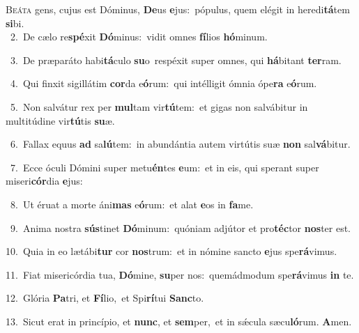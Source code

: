\lettrine{\initial\textcolor{\initialcolor}{B}}{eáta} gens, cujus est Dóminus, \textbf{De}\-us \textbf{e}\-jus:~\star pópulus, quem elégit in heredi\-\textbf{tá}\-tem \textbf{si}\-bi.\\
{\numbfont\textcolor{\numbcolor}{~2.}}~De cælo re\-\textbf{spé}\-xit \textbf{Dó}\-minus:~\star vidit omnes \textbf{fí}\-lios \textbf{hó}\-minum.\par
{\numbfont\textcolor{\numbcolor}{~3.}}~De præparáto habi\-\textbf{tá}\-culo \textbf{su}\-o~\star respéxit super omnes, qui \textbf{há}\-bitant \textbf{ter}\-ram.\par
{\numbfont\textcolor{\numbcolor}{~4.}}~Qui finxit sigillátim \textbf{cor}\-da e\-\textbf{ó}\-rum:~\star qui intélligit ómnia ópe\textbf{ra} e\-\textbf{ó}\-rum.\par
{\numbfont\textcolor{\numbcolor}{~5.}}~Non salvátur rex per \textbf{mul}\-tam vir\-\textbf{tú}\-tem:~\star et gigas non salvábitur in multitúdine vir\-\textbf{tú}\-tis \textbf{su}\-æ.\par
{\numbfont\textcolor{\numbcolor}{~6.}}~Fallax equus \textbf{ad} sa\-\textbf{lú}\-tem:~\star in abundántia autem virtútis suæ \textbf{non} sal\-\textbf{vá}\-bitur.\par
{\numbfont\textcolor{\numbcolor}{~7.}}~Ecce óculi Dómini super metu\-\textbf{én}\-tes \textbf{e}\-um:~\star et in eis, qui sperant super miseri\-\textbf{cór}\-dia \textbf{e}\-jus:\par
{\numbfont\textcolor{\numbcolor}{~8.}}~Ut éruat a morte áni\textbf{mas} e\-\textbf{ó}\-rum:~\star et alat \textbf{e}\-os in \textbf{fa}\-me.\par
{\numbfont\textcolor{\numbcolor}{~9.}}~Anima nostra \textbf{sús}\-tinet \textbf{Dó}\-minum:~\star quóniam adjútor et pro\-\textbf{téc}\-tor \textbf{nos}\-ter est.\par
{\numbfont\textcolor{\numbcolor}{10.}}~Quia in eo lætábi\textbf{tur} cor \textbf{nos}\-trum:~\star et in nómine sancto \textbf{e}\-jus spe\-\textbf{rá}\-vimus.\par
{\numbfont\textcolor{\numbcolor}{11.}}~Fiat misericórdia tua, \textbf{Dó}\-mine, \textbf{su}\-per nos:~\star quemádmodum spe\-\textbf{rá}\-vimus \textbf{in} te.\par
{\numbfont\textcolor{\numbcolor}{12.}}~Glória \textbf{Pa}\-tri, et \textbf{Fí}\-lio,~\star et Spi\-\textbf{rí}\-tui \textbf{Sanc}\-to.\par
{\numbfont\textcolor{\numbcolor}{13.}}~Sicut erat in princípio, et \textbf{nunc}\-, et \textbf{sem}\-per,~\star et in sǽcula sæcu\-\textbf{ló}\-rum. \textbf{A}\-men.\par
